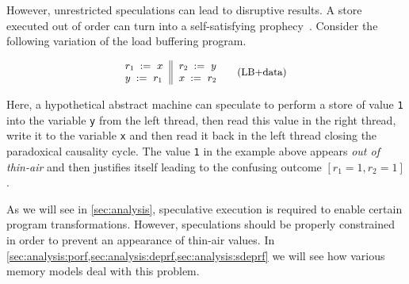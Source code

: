 However, unrestricted speculations can lead to disruptive results. 
A store executed out of order can turn into 
a self-satisfying prophecy~\cite{Boehm-Demsky:MSPC14}.
Consider the following variation of the load buffering program. 

\begin{equation*}
\small
\inarrII{
  \readInst{}{r_1}{x}   \\
  \writeInst{}{y}{r_1}  \\
}{
  \readInst{}{r_2}{y}   \\
  \writeInst{}{x}{r_2}  \\
}
\tag{LB+data}\label{ex:lb+data}
\end{equation*}

Here, a hypothetical abstract machine can speculate 
to perform a store of value \texttt{1} into the variable \texttt{y}
from the left thread, then read this value in the right thread, 
write it to the variable \texttt{x} and then read it back in the
left thread closing the paradoxical causality cycle.
The value \texttt{1} in the example above appears \emph{out of thin-air}
and then justifies itself leading to the confusing outcome ${[r_1=1, r_2=1]}$.

As we will see in \cref{sec:analysis}, speculative execution 
is required to enable certain program transformations. 
However, speculations should be properly constrained
in order to prevent an appearance of thin-air values. 
In \cref{sec:analysis:porf,sec:analysis:deprf,sec:analysis:sdeprf}
we will see how various memory models deal with this problem. 
